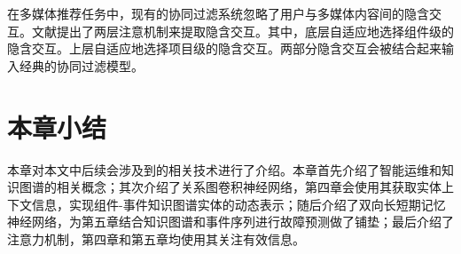 在多媒体推荐任务中，现有的协同过滤系统忽略了用户与多媒体内容间的隐含交互。文献\parencite{chen2017attentive}提出了两层注意机制来提取隐含交互。其中，底层自适应地选择组件级的隐含交互。上层自适应地选择项目级的隐含交互。两部分隐含交互会被结合起来输入经典的协同过滤模型。

\section{本章小结}
本章对本文中后续会涉及到的相关技术进行了介绍。本章首先介绍了智能运维和知识图谱的相关概念；其次介绍了关系图卷积神经网络，第四章会使用其获取实体上下文信息，实现组件-事件知识图谱实体的动态表示；随后介绍了双向长短期记忆神经网络，为第五章结合知识图谱和事件序列进行故障预测做了铺垫；最后介绍了注意力机制，第四章和第五章均使用其关注有效信息。
